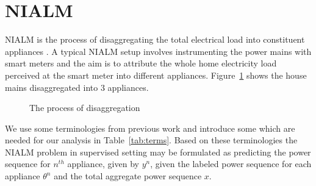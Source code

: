 \documentclass[conference]{IEEEtran}
\newcommand{\figref}[1]{Figure~\ref{#1}}
\newcommand{\tabref}[1]{Table~\ref{#1}}
\begin{document}
\section{NIALM}
NIALM is the process of disaggregating the total electrical load into constituent appliances \cite{hart}. A typical NIALM setup involves instrumenting the power mains with smart meters and the aim is to attribute the whole home electricity load perceived at the smart meter into different appliances. \figref{fig:disagg} shows the house mains disaggregated into 3 appliances.

\begin{figure} 
	
  	\caption{The process of disaggregation}
    \label{fig:disagg}
\end{figure}
We use some terminologies from previous work and introduce some which are needed for our analysis in \tabref{tab:terms}. Based on these terminologies the NIALM problem in supervised setting may be formulated as predicting the power sequence for $n^{th}$ appliance, given by $y^n$, given the labeled power sequence for each appliance $\theta^n$ and the total aggregate power sequence $x$.
\end{document}

